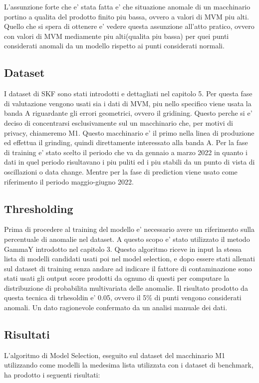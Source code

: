 L'assunzione forte che e' stata fatta e' che situazione anomale di un macchinario portino a qualita del prodotto finito piu bassa, ovvero a valori di MVM piu alti. Quello che si spera di ottenere e' vedere questa assunzione all'atto pratico, ovvero con valori di MVM mediamente piu alti(qualita piu bassa) per quei punti considerati anomali da un modello rispetto ai punti considerati normali.


\subsection{Dataset}
I dataset di SKF sono stati introdotti e dettagliati nel capitolo 5. Per questa fase di valutazione vengono usati sia i dati di MVM, piu nello specifico viene usata la banda A riguardante gli errori geometrici, ovvero il gridining. Questo perche si e' deciso di concentrarsi esclusivamente sul un macchinario che, per motivi di privacy, chiameremo M1. Questo macchinario e' il primo nella linea di produzione ed effettua il grinding, quindi direttamente interessato alla banda A.
Per la fase di training e' stato scelto il periodo che va da gennaio a marzo 2022 in quanto i dati in quel periodo risultavano i piu puliti ed i piu stabili da un punto di vista di oscillazioni o data change. Mentre per la fase di prediction viene usato come riferimento il periodo maggio-giugno 2022.



\subsection{Thresholding}
Prima di procedere al training del modello e' necessario avere un riferimento sulla percentuale di anomalie nel dataset. A questo scopo e' stato utilizzato il metodo GammaY introdotto nel capitolo 3.
Questo algoritmo riceve in input la stessa lista di modelli candidati usati poi nel model selection, e dopo essere stati allenati sul dataset di training senza andare ad indicare il fattore di contaminazione sono stati usati gli output score prodotti da ognuno di questi per computare la distribuzione di probabilita multivariata delle anomalie.
Il risultato prodotto da questa tecnica di trhesoldin e' 0.05, ovvero il 5\% di punti vengono considerati anomali. Un dato ragionevole confermato da un analisi manuale dei dati.


\subsection{Risultati}
L'algoritmo di Model Selection, eseguito sul dataset del macchinario M1 utilizzando come modelli la medesima lista utilizzata con i dataset di benchmark, ha prodotto i seguenti risultati:


